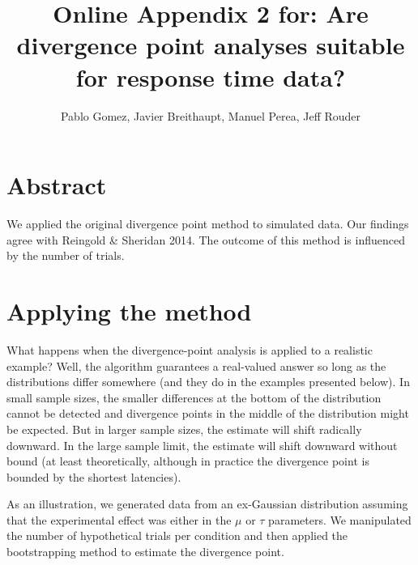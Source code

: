 \documentclass{article}
\begin{document}
\title{Online Appendix 2 for: Are divergence point analyses suitable for response time data?}
\author{Pablo Gomez, Javier Breithaupt, Manuel Perea, Jeff Rouder}


\maketitle
\section{Abstract}

We applied the original divergence point method to simulated data. Our findings agree with Reingold \& Sheridan 2014. The outcome of this method is influenced by the number of trials. 


\section{Applying the method}


What happens when the divergence-point analysis is applied to a realistic example?  Well, the algorithm guarantees a real-valued answer so long as the distributions differ somewhere (and they do in the examples presented below).   In small sample sizes, the smaller differences at the bottom of the distribution cannot be detected and divergence points in the middle of the distribution might be expected.  But in larger sample sizes, the estimate will shift radically downward.  In the large sample limit, the estimate will shift downward without bound (at least theoretically, although in practice the divergence point is bounded by the shortest latencies).  

        As an illustration, we generated data from an ex-Gaussian distribution assuming that the experimental effect was either in the $\mu$ or $\tau$ parameters.  We manipulated the number of hypothetical trials per condition and then applied the bootstrapping method to estimate the divergence point.
\end{document}
